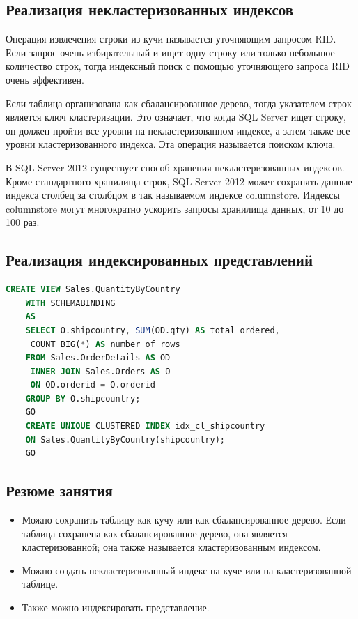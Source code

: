 \subsection{Реализация некластеризованных индексов}

Операция извлечения строки из кучи называется уточняющим
запросом RID. Если запрос очень избирательный и ищет одну строку или
только небольшое количество строк, тогда индексный поиск с помощью
уточняющего запроса RID очень эффективен.


Если таблица организована как сбалансированное дерево, тогда указателем строк
является ключ кластеризации. Это означает, что когда SQL Server ищет строку, он
должен пройти все уровни на некластеризованном индексе, а затем также
все уровни кластеризованного индекса. Эта операция называется поиском
ключа.


В SQL Server 2012 существует способ хранения некластеризованных индексов.
Кроме стандартного хранилища строк, SQL Server 2012 может сохранять данные
индекса столбец за столбцом в так называемом индексе columnstore. Индексы columnstore могут многократно ускорить запросы хранилища данных, от
10 до 100 раз.


\subsection{Реализация индексированных представлений}


\begin{lstlisting}[label=lst:funcReturn, language=sql]
	CREATE VIEW Sales.QuantityByCountry
	WITH SCHEMABINDING
	AS
	SELECT O.shipcountry, SUM(OD.qty) AS total_ordered,
	 COUNT_BIG(*) AS number_of_rows
	FROM Sales.OrderDetails AS OD
	 INNER JOIN Sales.Orders AS O
	 ON OD.orderid = O.orderid
	GROUP BY O.shipcountry;
	GO
	CREATE UNIQUE CLUSTERED INDEX idx_cl_shipcountry
	ON Sales.QuantityByCountry(shipcountry);
	GO
\end{lstlisting}

\subsection*{Резюме занятия}
\begin{itemize}
	\item Можно сохранить таблицу как кучу или как сбалансированное дерево. Если таблица сохранена как сбалансированное дерево, она является кластеризованной; она также называется кластеризованным индексом.
	\item Можно создать некластеризованный индекс на куче или на кластеризованной
	таблице. 
	\item Также можно индексировать представление. 
\end{itemize}

